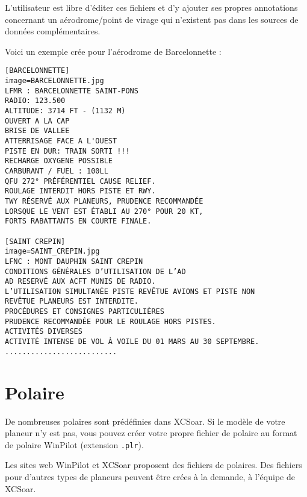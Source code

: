 L'utilisateur est libre d'éditer ces fichiers et d'y ajouter ses propres annotations concernant un aérodrome/point de virage qui n'existent pas dans les sources de données complémentaires.

Voici un exemple crée pour l'aérodrome de Barcelonnette :
\begin{verbatim}
[BARCELONNETTE]
image=BARCELONNETTE.jpg
LFMR : BARCELONNETTE SAINT-PONS
RADIO: 123.500
ALTITUDE: 3714 FT - (1132 M)
OUVERT A LA CAP
BRISE DE VALLEE
ATTERRISAGE FACE A L'OUEST 
PISTE EN DUR: TRAIN SORTI !!!
RECHARGE OXYGENE POSSIBLE
CARBURANT / FUEL : 100LL
QFU 272° PRÉFÉRENTIEL CAUSE RELIEF.
ROULAGE INTERDIT HORS PISTE ET RWY.
TWY RÉSERVÉ AUX PLANEURS, PRUDENCE RECOMMANDÉE
LORSQUE LE VENT EST ÉTABLI AU 270° POUR 20 KT,
FORTS RABATTANTS EN COURTE FINALE.

[SAINT CREPIN]
image=SAINT_CREPIN.jpg
LFNC : MONT DAUPHIN SAINT CREPIN
CONDITIONS GÉNÉRALES D’UTILISATION DE L’AD
AD RESERVÉ AUX ACFT MUNIS DE RADIO.
L’UTILISATION SIMULTANÉE PISTE REVÊTUE AVIONS ET PISTE NON
REVÊTUE PLANEURS EST INTERDITE.
PROCÉDURES ET CONSIGNES PARTICULIÈRES
PRUDENCE RECOMMANDÉE POUR LE ROULAGE HORS PISTES.
ACTIVITÉS DIVERSES
ACTIVITÉ INTENSE DE VOL À VOILE DU 01 MARS AU 30 SEPTEMBRE.
..........................

\end{verbatim}

\section{Polaire} \label{sec:glide-polar}

De nombreuses polaires sont prédéfinies dans XCSoar. Si le modèle de votre planeur n'y est pas, vous pouvez créer votre propre fichier de polaire au format de polaire WinPilot (extension \verb|.plr|).

Les sites web WinPilot et XCSoar proposent des fichiers de polaires. Des fichiers pour d'autres types de planeurs peuvent être crées à la demande, à l'équipe de XCSoar.

